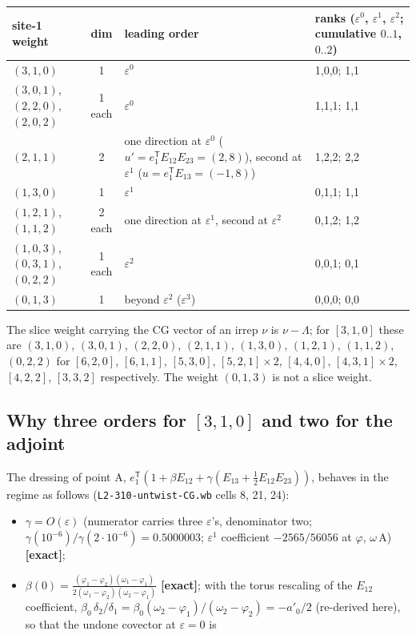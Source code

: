 \documentclass[10pt]{article}
\newcommand{\nb}[1]{\texttt{#1}}
\begin{document}
\begin{center}\small\setlength{\tabcolsep}{3pt}\begin{longtable}{@{}p{3.6cm}cp{5.8cm}p{4.5cm}@{}}\toprule
\textbf{site-1 weight} & \textbf{dim} & \textbf{leading order} & \textbf{ranks ($\varepsilon^0$, $\varepsilon^1$, $\varepsilon^2$; cumulative $0..1$, $0..2$)} \\\midrule\endhead
$(3,1,0)$ & 1 & $\varepsilon^0$ & 1,0,0; 1,1 \\
$(3,0,1)$, $(2,2,0)$, $(2,0,2)$ & 1 each & $\varepsilon^0$ & 1,1,1; 1,1 \\
$(2,1,1)$ & 2 & one direction at $\varepsilon^0$ ($u'=e_1^{\mathsf T}E_{12}E_{23}=(2,8)$), second at $\varepsilon^1$ ($u=e_1^{\mathsf T}E_{13}=(-1,8)$) & 1,2,2; 2,2 \\
$(1,3,0)$ & 1 & $\varepsilon^1$ & 0,1,1; 1,1 \\
$(1,2,1)$, $(1,1,2)$ & 2 each & one direction at $\varepsilon^1$, second at $\varepsilon^2$ & 0,1,2; 1,2 \\
$(1,0,3)$, $(0,3,1)$, $(0,2,2)$ & 1 each & $\varepsilon^2$ & 0,0,1; 0,1 \\
$(0,1,3)$ & 1 & beyond $\varepsilon^2$ ($\varepsilon^3$) & 0,0,0; 0,0 \\
\bottomrule\end{longtable}\end{center}

The slice weight carrying the CG vector of an irrep $\nu$ is $\nu-\Lambda$; for $[3,1,0]$ these are $(3,1,0)$, $(3,0,1)$, $(2,2,0)$, $(2,1,1)$, $(1,3,0)$, $(1,2,1)$, $(1,1,2)$, $(0,2,2)$ for $[6,2,0]$, $[6,1,1]$, $[5,3,0]$, $[5,2,1]\times2$, $[4,4,0]$, $[4,3,1]\times2$, $[4,2,2]$, $[3,3,2]$ respectively. The weight $(0,1,3)$ is not a slice weight.

\subsection{Why three orders for $[3,1,0]$ and two for the adjoint}\label{sec:orders}

The dressing of point A, $e_1^{\mathsf T}(1+\beta E_{12}+\gamma(E_{13}+\frac12E_{12}E_{23}))$, behaves in the regime as follows (\nb{L2-\allowbreak{}310-\allowbreak{}untwist-\allowbreak{}CG.\allowbreak{}wb} cells 8, 21, 24):

\begin{itemize}\setlength{\itemsep}{1pt}
\item $\gamma=O(\varepsilon)$ (numerator carries three $\varepsilon$'s, denominator two; $\gamma(10^{-6})/\gamma(2\cdot10^{-6})=0.5000003$; $\varepsilon^1$ coefficient $-2565/56056$ at $\varphi$, $\omega\,\mathrm{A}$) \textbf{[exact]};
\item $\beta(0)=\frac{(\varphi_1-\varphi_2)(\omega_1-\varphi_1)}{2(\omega_1-\varphi_2)(\omega_2-\varphi_1)}$ \textbf{[exact]}; with the torus rescaling of the $E_{12}$ coefficient, $\beta_0\,\delta_2/\delta_1=\beta_0(\omega_2-\varphi_1)/(\omega_2-\varphi_2)=-a'_0/2$ (re-derived here), so that the undone covector at $\varepsilon=0$ is
\end{itemize}
\end{document}
